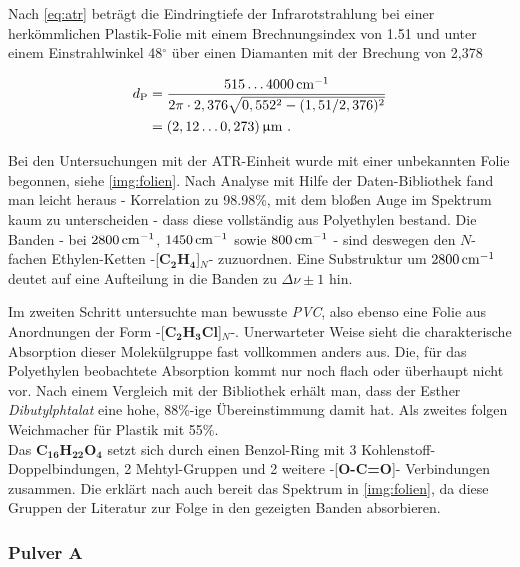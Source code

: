 \documentclass[a4paper,10pt,twocolumn]{article}
\newcommand{\ix}[1]{_\text{#1}}
\newcommand{\tilt}[1]{\textit{#1}}
\newcommand{\fett}[1]{\textbf{#1}}
\begin{document}
		Nach \autoref{eq:atr} betr\"agt die Eindringtiefe der Infrarotstrahlung bei einer herk\"ommlichen Plastik-Folie mit einem Brechnungsindex von 1.51 und unter einem Einstrahlwinkel 48$^{\circ}$ \"uber einen Diamanten mit der Brechung von 2,378 
		
		\begin{align}
			d\ix{P}&=\frac{\unit[515\dots4000]{cm^{-1}}}{2\pi\cdot2,376\sqrt{0,552^{2}-(1,51/2,376)^{2}}} \nonumber \\
			&=\unit[(2,12\dots0,273)]{\upmu m}\,\, .\nonumber
		\end{align}
		
		Bei den Untersuchungen mit der ATR-Einheit wurde mit einer unbekannten Folie begonnen, siehe \autoref{img:folien}. Nach Analyse mit Hilfe der Daten-Bibliothek fand man leicht heraus - Korrelation zu 98.98\%, mit dem blo{\ss}en Auge im Spektrum kaum zu unterscheiden - dass diese vollst\"andig aus Polyethylen bestand. Die Banden - bei $\unit[2800]{cm^{-1}}$, $\unit[1450]{cm^{-1}}$ sowie $\unit[800]{cm^{-1}}$ - sind deswegen den $N$-fachen Ethylen-Ketten -[\fett{C}$_{\fett{2}}$\fett{H}$_{\fett{4}}$]$_{N}$- zuzuordnen. Eine Substruktur um $\unit[2800]{cm^{-1}}$ deutet auf eine Aufteilung in die Banden zu $\Delta\nu\pm1$ hin.

	\newpage

		Im zweiten Schritt untersuchte man bewusste \tilt{PVC}, also ebenso eine Folie aus Anordnungen der Form -[\fett{C}$_{\fett{2}}$\fett{H}$_{\fett{3}}$\fett{Cl}]$_{N}$-. Unerwarteter Weise sieht die charakterische Absorption dieser Molek\"ulgruppe fast vollkommen anders aus. Die, f\"ur das Polyethylen beobachtete Absorption kommt nur noch flach oder \"uberhaupt nicht vor. Nach einem Vergleich mit der Bibliothek erh\"alt man, dass der Esther \tilt{Dibutylphtalat} eine hohe, 88\%-ige \"Ubereinstimmung damit hat. Als zweites folgen Weichmacher f\"ur Plastik mit 55\%.\\
		Das \fett{C}$_{\fett{16}}$\fett{H}$_{\fett{22}}$\fett{O}$_{\fett{4}}$ setzt sich durch einen Benzol-Ring mit 3 Kohlenstoff-Doppelbindungen, 2 Mehtyl-Gruppen und 2 weitere -[\fett{O-C=O}]- Verbindungen zusammen. Die erkl\"art nach \cite{FTIRAnl} auch bereit das Spektrum in \autoref{img:folien}, da diese Gruppen der Literatur zur Folge in den gezeigten Banden absorbieren.

	\newpage

		\subsubsection{Pulver A}
\end{document}
